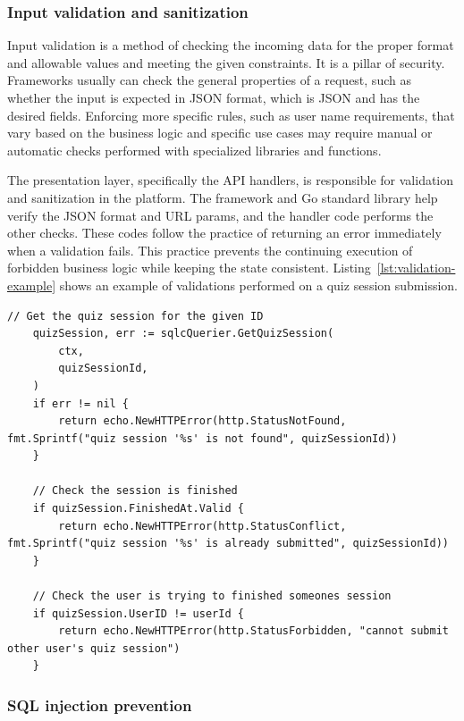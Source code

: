 \subsubsection{Input validation and sanitization}

Input validation is a method of checking the incoming data for the proper format and allowable values and meeting the given constraints. It is a pillar of security. Frameworks usually can check the general properties of a request, such as whether the input is expected in JSON format, which is JSON and has the desired fields. Enforcing more specific rules, such as user name requirements, that vary based on the business logic and specific use cases may require manual or automatic checks performed with specialized libraries and functions.

The presentation layer, specifically the API handlers, is responsible for validation and sanitization in the platform. The framework and Go standard library help verify the JSON format and URL params, and the handler code performs the other checks. These codes follow the practice of returning an error immediately when a validation fails. This practice prevents the continuing execution of forbidden business logic while keeping the state consistent. Listing~\ref{lst:validation-example} shows an example of validations performed on a quiz session submission.

\begin{lstlisting}[caption=Validation example,label=lst:validation-example]
    // Get the quiz session for the given ID
    quizSession, err := sqlcQuerier.GetQuizSession(
        ctx,
        quizSessionId,
    )
    if err != nil {
        return echo.NewHTTPError(http.StatusNotFound, fmt.Sprintf("quiz session '%s' is not found", quizSessionId))
    }

    // Check the session is finished
    if quizSession.FinishedAt.Valid {
        return echo.NewHTTPError(http.StatusConflict, fmt.Sprintf("quiz session '%s' is already submitted", quizSessionId))
    }

    // Check the user is trying to finished someones session
    if quizSession.UserID != userId {
        return echo.NewHTTPError(http.StatusForbidden, "cannot submit other user's quiz session")
    }
\end{lstlisting}

\subsubsection{SQL injection prevention}

